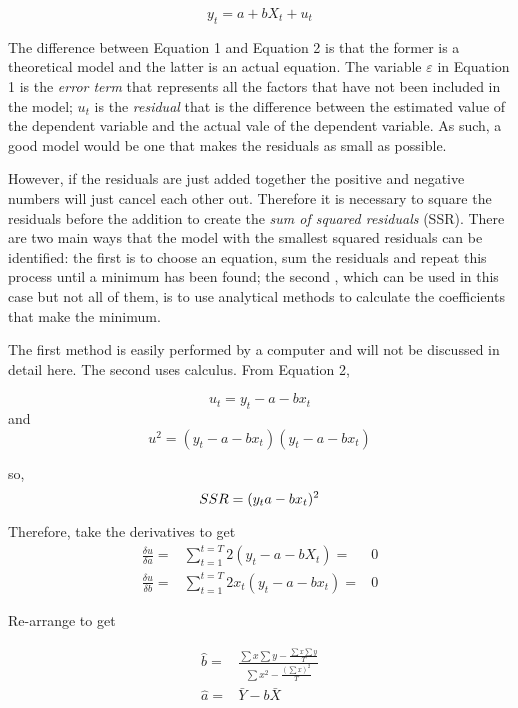 \documentclass{article}\usepackage[]{graphicx}\usepackage[]{color}
\begin{document}
\begin{equation}
y_t = a + bX_t + u_t
\end{equation}

The difference between Equation 1 and Equation 2 is that the former is a theoretical model and the latter is an actual equation.   The variable $\varepsilon$ in Equation 1 is the \emph{error term} that represents all the factors that have not been included in the model; $u_t$ is the \emph{residual}  that is the difference between the estimated value of the dependent variable and the actual vale of the dependent variable.  As such, a good model would be one that makes the residuals as small as possible.


However, if the residuals are just added together the positive and negative numbers will just cancel each other out.  Therefore
 it is necessary to square the residuals before the addition to create the \emph{sum of squared residuals} (SSR).  There are two main ways that the model with the smallest squared residuals can be identified: the first is to choose an equation, sum the residuals and repeat this process until a minimum has been found; the second , which can be used in this case but not all of them, is to use analytical methods to calculate the coefficients that make the minimum.

The first method is easily performed by a computer and will not be discussed in detail here.  The second uses calculus.  From Equation 2,

\begin{equation}
u_t = y_t - a - bx_t
\end{equation}
and
\begin{equation}
u^2 = (y_t - a - bx_t)(y_t -a - bx_t)
\end{equation}

so,
\begin{equation}
SSR = (y_t a - bx_t)^2\\
\end{equation}

Therefore, take the derivatives to get 
\begin{align*}
\frac{\delta u}{\delta a} = &\sum_{t=1}^{t=T} 2(y_t - a - bX_t) =& 0\\
\frac{\delta u}{\delta b} = &\sum_{t=1}^{t=T} 2x_t(y_t - a - bx_t) =& 0
\end{align*}

Re-arrange to get 

\begin{align*}
\hat{b} =& \frac{\sum x \sum y - \frac{\sum x \sum y}{T}}{\sum x^2 - \frac{(\sum x)^2}{T}}\\
\hat{a} = & \bar{Y} - b\bar{X}
\end{align*}
\end{document}
